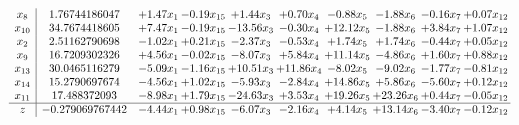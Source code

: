 \documentclass[9pt]{article}
\begin{document}
\[\begin{array}{c| c c@{\hskip 2pt} c@{\hskip 2pt} c@{\hskip 2pt} c@{\hskip 2pt} c@{\hskip 2pt} c@{\hskip 2pt} c@{\hskip 2pt} c@{\hskip 2pt} }
 x_{8}   &  1.76744186047 & +  1.47 x_{1} & -0.19 x_{15} & +  1.44 x_{3} & +  0.70 x_{4} & -0.88 x_{5} & -1.88 x_{6} & -0.16 x_{7} & +  0.07 x_{12}\\
 x_{10}   &  34.7674418605 & +  7.47 x_{1} & -0.19 x_{15} & -13.56 x_{3} & -0.30 x_{4} & + 12.12 x_{5} & -1.88 x_{6} & +  3.84 x_{7} & +  1.07 x_{12}\\
 x_{2}   &  2.51162790698 & -1.02 x_{1} & +  0.21 x_{15} & -2.37 x_{3} & -0.53 x_{4} & +  1.74 x_{5} & +  1.74 x_{6} & -0.44 x_{7} & +  0.05 x_{12}\\
 x_{9}   &  16.7209302326 & +  4.56 x_{1} & -0.02 x_{15} & -8.07 x_{3} & +  5.84 x_{4} & + 11.14 x_{5} & -4.86 x_{6} & +  1.60 x_{7} & +  0.88 x_{12}\\
 x_{13}   &  30.0465116279 & -5.09 x_{1} & -1.16 x_{15} & + 10.51 x_{3} & + 11.86 x_{4} & -8.02 x_{5} & -9.02 x_{6} & -1.77 x_{7} & -0.81 x_{12}\\
 x_{14}   &  15.2790697674 & -4.56 x_{1} & +  1.02 x_{15} & -5.93 x_{3} & -2.84 x_{4} & + 14.86 x_{5} & +  5.86 x_{6} & -5.60 x_{7} & +  0.12 x_{12}\\
 x_{11}   &  17.488372093 & -8.98 x_{1} & +  1.79 x_{15} & -24.63 x_{3} & +  3.53 x_{4} & + 19.26 x_{5} & + 23.26 x_{6} & +  0.44 x_{7} & -0.05 x_{12}\\
\hline
z    &  -0.279069767442 & -4.44 x_{1} & +  0.98 x_{15} & -6.07 x_{3} & -2.16 x_{4} & +  4.14 x_{5} & + 13.14 x_{6} & -3.40 x_{7} & -0.12 x_{12}\\
\end{array}\]
\end{document}
